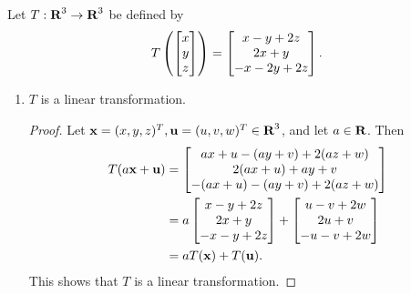 \documentclass{homework}
\begin{document}
	\maketitle
	
	\question Let $T : \textnormal{\bf R}^3 \to \textnormal{\bf R}^3$ be defined by
	\begin{equation*}
		T\left(\left[\begin{matrix}x\\y\\z\end{matrix}\right]\right) = \left[\begin{matrix}x-y+2z \\ 2x+y \\ -x-2y+2z\end{matrix}\right].
	\end{equation*}
	
	\begin{enumerate}
		\item $T$ is a linear transformation.
		\begin{proof}
			Let $\mathbf{x} = (x,y,z)^T, \mathbf{u} = (u,v,w)^T \in \textnormal{\bf R}^3$, and let $a \in \textnormal{\bf R}$. Then
			\begin{equation*}
				\begin{aligned}
					T(a\mathbf{x} + \mathbf{u}) &= \left[\begin{matrix}ax+u - (ay+v) + 2(az+w) \\ 2(ax+u) + ay+v \\ -(ax+u) - (ay+v) + 2(az+w)\end{matrix}\right]\\
					&= a\left[\begin{matrix}x-y+2z \\ 2x+y \\ -x-y+2z\end{matrix}\right] + \left[\begin{matrix}u -v+2w \\ 2u + v \\ -u-v+2w\end{matrix}\right] \\
					&= aT(\mathbf{x}) + T(\mathbf{u}).
				\end{aligned}
			\end{equation*}
			This shows that $T$ is a linear transformation.
		\end{proof}
	\end{enumerate}
	
\end{document}
